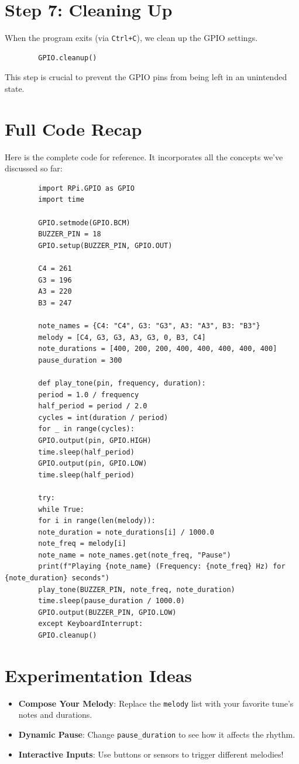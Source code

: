 \documentclass{article}
\begin{document}
	\section*{Step 7: Cleaning Up}
	When the program exits (via \texttt{Ctrl+C}), we clean up the GPIO settings.
	
	\begin{lstlisting}
		GPIO.cleanup()
	\end{lstlisting}
	
	This step is crucial to prevent the GPIO pins from being left in an unintended state.
	
	
	\newpage
	\section*{Full Code Recap}
	Here is the complete code for reference. It incorporates all the concepts we’ve discussed so far:
	
	\begin{lstlisting}
		import RPi.GPIO as GPIO
		import time
		
		GPIO.setmode(GPIO.BCM)
		BUZZER_PIN = 18
		GPIO.setup(BUZZER_PIN, GPIO.OUT)
		
		C4 = 261
		G3 = 196
		A3 = 220
		B3 = 247
		
		note_names = {C4: "C4", G3: "G3", A3: "A3", B3: "B3"}
		melody = [C4, G3, G3, A3, G3, 0, B3, C4]
		note_durations = [400, 200, 200, 400, 400, 400, 400, 400]
		pause_duration = 300
		
		def play_tone(pin, frequency, duration):
		period = 1.0 / frequency
		half_period = period / 2.0
		cycles = int(duration / period)
		for _ in range(cycles):
		GPIO.output(pin, GPIO.HIGH)
		time.sleep(half_period)
		GPIO.output(pin, GPIO.LOW)
		time.sleep(half_period)
		
		try:
		while True:
		for i in range(len(melody)):
		note_duration = note_durations[i] / 1000.0
		note_freq = melody[i]
		note_name = note_names.get(note_freq, "Pause")
		print(f"Playing {note_name} (Frequency: {note_freq} Hz) for {note_duration} seconds")
		play_tone(BUZZER_PIN, note_freq, note_duration)
		time.sleep(pause_duration / 1000.0)
		GPIO.output(BUZZER_PIN, GPIO.LOW)
		except KeyboardInterrupt:
		GPIO.cleanup()
	\end{lstlisting}
	
	\section*{Experimentation Ideas}
	\begin{itemize}
		\item \textbf{Compose Your Melody}: Replace the \texttt{melody} list with your favorite tune’s notes and durations.
		\item \textbf{Dynamic Pause}: Change \texttt{pause\_duration} to see how it affects the rhythm.
		\item \textbf{Interactive Inputs}: Use buttons or sensors to trigger different melodies!
	\end{itemize}
	
\end{document}
